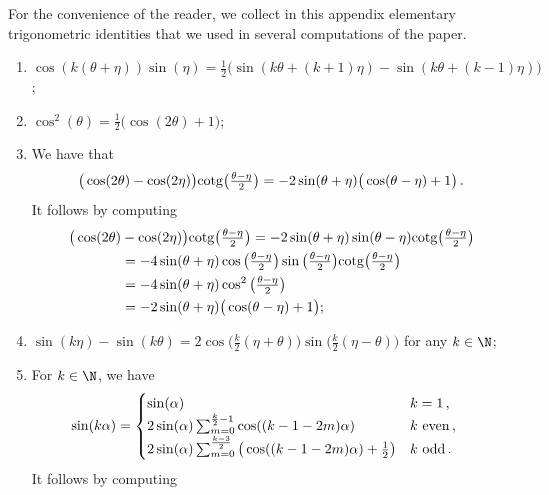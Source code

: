\documentclass[a4paper,reqno,10pt]{article}
\begin{document}
For the convenience of the reader, we collect in this appendix elementary trigonometric identities that we used in several computations of the paper.
\begin{enumerate}
	\item $\cos(k(\theta+\eta))\sin(\eta) = \tfrac12 \big( \sin(k\theta+(k+1)\eta) - \sin(k\theta+(k-1)\eta) \big)$;
	\item $\cos^2(\theta) = \tfrac12\big( \cos(2\theta)+1 \big)$;
	\item We have that
	\begin{equation}
		\big( \cos(2\theta)-\cos(2\eta) \big) {\rm cotg} \big( \tfrac{\theta-\eta}{2} \big) = - 2 \sin(\theta+\eta) \big( \cos(\theta-\eta)+1 \big) \,.
	\end{equation}
	It follows by computing
	\begin{equation}
		\begin{aligned}
				\big( \cos(2\theta)&-\cos(2\eta) \big) {\rm cotg} \big( \tfrac{\theta-\eta}{2} \big)  = -2 \sin(\theta+\eta) \sin(\theta-\eta) {\rm cotg} \big( \tfrac{\theta-\eta}{2} \big) \\
				& = - 4\sin(\theta+\eta) \cos \big( \tfrac{\theta-\eta}{2} \big)  \sin \big( \tfrac{\theta-\eta}{2} \big)  {\rm cotg} \big( \tfrac{\theta-\eta}{2} \big)\\
				& =- 4\sin(\theta+\eta)  \cos^2 \big( \tfrac{\theta-\eta}{2} \big) \\
				& = - 2 \sin(\theta+\eta) \big( \cos(\theta-\eta)+1 \big) ;
		\end{aligned}
	\end{equation}
	\item $\sin(k\eta)- \sin(k\theta) = 2 \cos\big(\tfrac{k}{2}(\eta+\theta)\big) \sin\big(\tfrac{k}{2}(\eta-\theta)\big) $ for any $k\in\N$;
	\item
	For $k \in \N$, we have
	\begin{equation}\label{sink}
		\begin{aligned}
			\sin(k \alpha) 
			&=\begin{cases}
				\sin(\alpha) & k=1 \,, \\
				2 \sin(\alpha) \sum_{m=0}^{ \frac{k}{2} -1 }\cos((k-1-2m)\alpha) & k \ {\rm even} \,, \\
				2 \sin(\alpha) \sum_{m=0}^{ \frac{k-3}{2}  }\big( \cos((k-1-2m)\alpha) +\tfrac12 \big)& k \ {\rm odd} \,.
			\end{cases}
		\end{aligned}
	\end{equation}
	It follows by computing
	\begin{align}

\end{align}
\end{enumerate}
\end{document}

